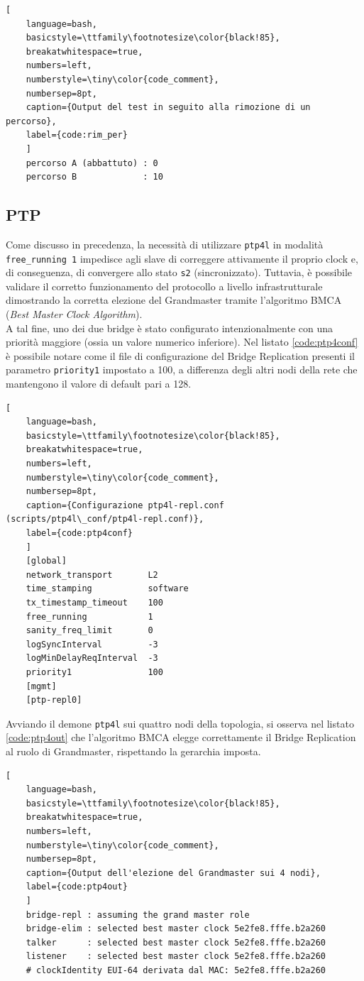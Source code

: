 \documentclass[12pt,a4paper,twoside]{book}
\begin{document}
\begin{onehalfspace}
\begin{lstlisting}[
    language=bash,
    basicstyle=\ttfamily\footnotesize\color{black!85},
    breakatwhitespace=true,
    numbers=left,
    numberstyle=\tiny\color{code_comment},
    numbersep=8pt,
    caption={Output del test in seguito alla rimozione di un percorso},
    label={code:rim_per}
    ]
    percorso A (abbattuto) : 0
    percorso B             : 10
\end{lstlisting}
\subsection{PTP}
Come discusso in precedenza, la necessità di utilizzare \texttt{ptp4l} in modalità \texttt{free\_running 1} impedisce agli slave di correggere attivamente il proprio clock e, di conseguenza, di convergere allo stato \texttt{s2} (sincronizzato). Tuttavia, è possibile validare il corretto funzionamento del protocollo a livello infrastrutturale dimostrando la corretta elezione del Grandmaster tramite l'algoritmo BMCA (\textit{Best Master Clock Algorithm}).
\\
A tal fine, uno dei due bridge è stato configurato intenzionalmente con una priorità maggiore (ossia un valore numerico inferiore). Nel listato \ref{code:ptp4conf} è possibile notare come il file di configurazione del Bridge Replication presenti il parametro \texttt{priority1} impostato a 100, a differenza degli altri nodi della rete che mantengono il valore di default pari a 128.

\begin{lstlisting}[
    language=bash,
    basicstyle=\ttfamily\footnotesize\color{black!85},
    breakatwhitespace=true,
    numbers=left,
    numberstyle=\tiny\color{code_comment},
    numbersep=8pt,
    caption={Configurazione ptp4l-repl.conf (scripts/ptp4l\_conf/ptp4l-repl.conf)},
    label={code:ptp4conf}
    ]
    [global]
    network_transport       L2
    time_stamping           software
    tx_timestamp_timeout    100
    free_running            1
    sanity_freq_limit       0
    logSyncInterval         -3
    logMinDelayReqInterval  -3
    priority1               100
    [mgmt]
    [ptp-repl0]
\end{lstlisting}

Avviando il demone \texttt{ptp4l} sui quattro nodi della topologia, si osserva nel listato \ref{code:ptp4out} che l'algoritmo BMCA elegge correttamente il Bridge Replication al ruolo di Grandmaster, rispettando la gerarchia imposta.

\begin{lstlisting}[
    language=bash,
    basicstyle=\ttfamily\footnotesize\color{black!85},
    breakatwhitespace=true,
    numbers=left,
    numberstyle=\tiny\color{code_comment},
    numbersep=8pt,
    caption={Output dell'elezione del Grandmaster sui 4 nodi},
    label={code:ptp4out}
    ]
    bridge-repl : assuming the grand master role
    bridge-elim : selected best master clock 5e2fe8.fffe.b2a260
    talker      : selected best master clock 5e2fe8.fffe.b2a260
    listener    : selected best master clock 5e2fe8.fffe.b2a260
    # clockIdentity EUI-64 derivata dal MAC: 5e2fe8.fffe.b2a260 
\end{lstlisting}


\end{onehalfspace}
\end{document}
